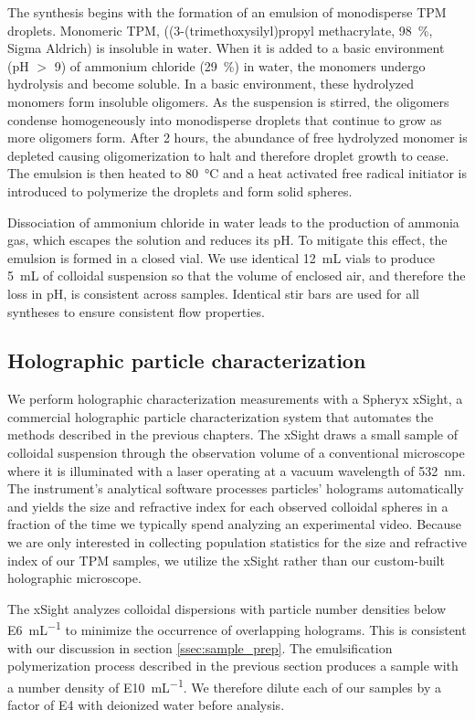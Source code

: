 The synthesis begins with the formation of an emulsion of monodisperse TPM droplets.
Monomeric TPM, ((3-(trimethoxysilyl)propyl methacrylate, \SI{98}{\percent}, Sigma Aldrich)
is insoluble in water. When it is added to a basic environment
(pH $>$ \num{9}) of ammonium chloride (\SI{29}{\percent}) in water,
the monomers undergo hydrolysis and become soluble. 
In a basic environment, these hydrolyzed monomers form insoluble 
oligomers. As the suspension is stirred, the oligomers condense 
homogeneously into monodisperse droplets that continue to grow as more oligomers form.
After \num{2} hours, the abundance of free hydrolyzed monomer is depleted
causing oligomerization to halt and therefore droplet growth to cease.
The emulsion is then heated to \SI{80}{\degreeCelsius} and a heat activated free radical 
initiator is introduced to polymerize the droplets and form solid spheres.

Dissociation of ammonium chloride in water leads to the production of ammonia
gas, which escapes the solution and reduces its pH.
To mitigate this effect, the emulsion is formed in a closed vial.
We use identical \SI{12}{\milli\liter} vials to produce \SI{5}{\milli\liter}
of colloidal suspension so that the volume of enclosed air, and therefore
the loss in pH, is consistent across samples. Identical stir bars are used for all syntheses
to ensure consistent flow properties.

\subsection{Holographic particle characterization}

We perform holographic characterization measurements with a Spheryx xSight,
a commercial holographic particle characterization system
that automates the methods described in the previous chapters.
The xSight draws a small sample of colloidal suspension through the
observation volume of a conventional microscope where it is illuminated
with a laser operating at a vacuum wavelength of \SI{532}{\nm}.
The instrument's analytical software processes particles' holograms automatically
and yields the size and refractive index for each observed colloidal spheres
in a fraction of the time we typically spend analyzing an experimental video.
Because we are only interested in collecting population statistics for the size and refractive
index of our TPM samples, we utilize the xSight rather than our custom-built holographic
microscope.

The xSight analyzes colloidal dispersions with particle number densities below 
\SI{E6}{\milli\liter^{-1}} to minimize the occurrence of overlapping holograms.
This is consistent with our discussion in section \ref{ssec:sample_prep}.
The emulsification polymerization process described in the previous section
produces a sample with a number density of \SI{E10}{\milli\liter^{-1}}.
We therefore dilute each of our samples by a factor of \SI{E4}{} with
deionized water before analysis.

